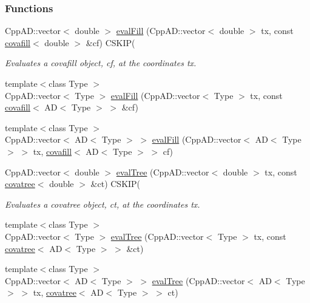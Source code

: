 \subsubsection*{Functions}
\begin{DoxyCompactItemize}
\item 
\hypertarget{group__tmb_ga0862de227e5abdeba2394525467bafe4}{}Cpp\+A\+D\+::vector$<$ double $>$ \hyperlink{group__tmb_ga0862de227e5abdeba2394525467bafe4}{eval\+Fill} (Cpp\+A\+D\+::vector$<$ double $>$ tx, const \hyperlink{classcovafill}{covafill}$<$ double $>$ \&cf) C\+S\+K\+I\+P(\label{group__tmb_ga0862de227e5abdeba2394525467bafe4}

\begin{DoxyCompactList}\small\item\em Evaluates a covafill object, {\itshape cf}, at the coordinates {\itshape tx}. \end{DoxyCompactList}\item 
{\footnotesize template$<$class Type $>$ }\\Cpp\+A\+D\+::vector$<$ Type $>$ \hyperlink{group__tmb_ga832a30ea46b9b7ef9237e1b2afb515ed}{eval\+Fill} (Cpp\+A\+D\+::vector$<$ Type $>$ tx, const \hyperlink{classcovafill}{covafill}$<$ A\+D$<$ Type $>$ $>$ \&cf)
\item 
{\footnotesize template$<$class Type $>$ }\\Cpp\+A\+D\+::vector$<$ A\+D$<$ Type $>$ $>$ \hyperlink{group__tmb_ga8de4c7f2e9aadad8f6ed8d5cd70ce215}{eval\+Fill} (Cpp\+A\+D\+::vector$<$ A\+D$<$ Type $>$ $>$ tx, \hyperlink{classcovafill}{covafill}$<$ A\+D$<$ Type $>$ $>$ cf)
\item 
\hypertarget{group__tmb_ga2d45496af4f9bbb2895ef0a9adb0ff34}{}Cpp\+A\+D\+::vector$<$ double $>$ \hyperlink{group__tmb_ga2d45496af4f9bbb2895ef0a9adb0ff34}{eval\+Tree} (Cpp\+A\+D\+::vector$<$ double $>$ tx, const \hyperlink{classcovatree}{covatree}$<$ double $>$ \&ct) C\+S\+K\+I\+P(\label{group__tmb_ga2d45496af4f9bbb2895ef0a9adb0ff34}

\begin{DoxyCompactList}\small\item\em Evaluates a covatree object, {\itshape ct}, at the coordinates {\itshape tx}. \end{DoxyCompactList}\item 
{\footnotesize template$<$class Type $>$ }\\Cpp\+A\+D\+::vector$<$ Type $>$ \hyperlink{group__tmb_gad534509dc8a9a30772926696b2e9b1b1}{eval\+Tree} (Cpp\+A\+D\+::vector$<$ Type $>$ tx, const \hyperlink{classcovatree}{covatree}$<$ A\+D$<$ Type $>$ $>$ \&ct)
\item 
{\footnotesize template$<$class Type $>$ }\\Cpp\+A\+D\+::vector$<$ A\+D$<$ Type $>$ $>$ \hyperlink{group__tmb_ga074884f7432feb68f12ee89984882a29}{eval\+Tree} (Cpp\+A\+D\+::vector$<$ A\+D$<$ Type $>$ $>$ tx, \hyperlink{classcovatree}{covatree}$<$ A\+D$<$ Type $>$ $>$ ct)
\end{DoxyCompactItemize}



